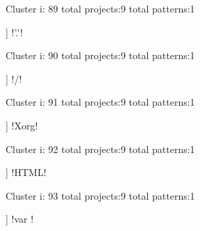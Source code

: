 Cluster i: 89
total projects:9
total patterns:1
\begin{multicols}{1}
\begin{description}[noitemsep,topsep=0pt]
\item [[9] ] \cverb!'.'!
\end{description}
\end{multicols}







Cluster i: 90
total projects:9
total patterns:1
\begin{multicols}{1}
\begin{description}[noitemsep,topsep=0pt]
\item [[9] ] \cverb!\*/!
\end{description}
\end{multicols}







Cluster i: 91
total projects:9
total patterns:1
\begin{multicols}{1}
\begin{description}[noitemsep,topsep=0pt]
\item [[9] ] \cverb!Xorg!
\end{description}
\end{multicols}







Cluster i: 92
total projects:9
total patterns:1
\begin{multicols}{1}
\begin{description}[noitemsep,topsep=0pt]
\item [[9] ] \cverb!HTML!
\end{description}
\end{multicols}







Cluster i: 93
total projects:9
total patterns:1
\begin{multicols}{1}
\begin{description}[noitemsep,topsep=0pt]
\item [[9] ] \cverb!var !
\end{description}
\end{multicols}








